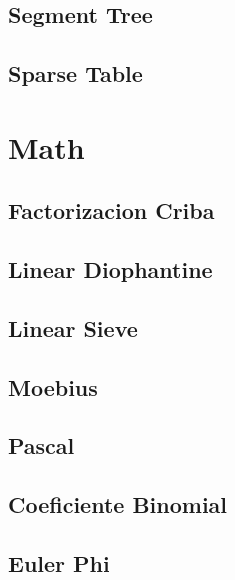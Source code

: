 \subsection{   Segment Tree}
\raggedbottom
\hrulefill
\subsection{   Sparse Table}
\raggedbottom
\hrulefill

\section{Math}
\subsection{	Factorizacion Criba}
\raggedbottom
\hrulefill
\subsection{	Linear Diophantine}
\raggedbottom
\hrulefill
\subsection{	Linear Sieve}
\raggedbottom
\hrulefill
\subsection{	Moebius}
\raggedbottom
\hrulefill
\subsection{	Pascal}
\raggedbottom
\hrulefill
\subsection{	Coeficiente Binomial}
\raggedbottom
\hrulefill
\subsection{	Euler Phi}
\raggedbottom
\hrulefill

